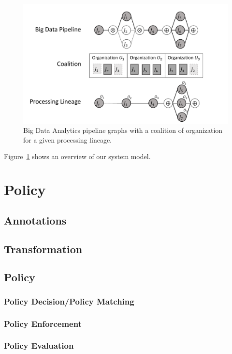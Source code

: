
\begin{figure}[!t]
  \includegraphics[width=0.98\columnwidth]{generaleFig1.pdf}
  \caption{Big Data Analytics pipeline graphs with a coalition of organization for a given processing lineage.}\label{fig:BDpipeline}
\end{figure}

Figure~\ref{fig:BDpipeline} shows an overview of our system model.




\section{Policy}

\subsection{Annotations}
\subsection{Transformation}
\subsection{Policy}

\subsubsection{Policy Decision/Policy Matching}
\subsubsection{Policy Enforcement}
\subsubsection{Policy Evaluation}